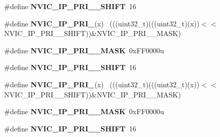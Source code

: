 \begin{DoxyCompactItemize}
\item 
\hypertarget{group___n_v_i_c___register___masks_ga18e47397c19f9f734a16ab82ab12a5a1}{}\#define {\bfseries N\+V\+I\+C\+\_\+\+I\+P\+\_\+\+P\+R\+I\+\_\+\_\+\+S\+H\+I\+F\+T}~16\label{group___n_v_i_c___register___masks_ga18e47397c19f9f734a16ab82ab12a5a1}

\item 
\hypertarget{group___n_v_i_c___register___masks_gaeccf3d1caf74b8e53c44c111b530082f}{}\#define {\bfseries N\+V\+I\+C\+\_\+\+I\+P\+\_\+\+P\+R\+I\+\_}(x)                                            ~(((uint32\+\_\+t)(((uint32\+\_\+t)(x))$<$$<$N\+V\+I\+C\+\_\+\+I\+P\+\_\+\+P\+R\+I\+\_\+\_\+\+S\+H\+I\+F\+T))\&N\+V\+I\+C\+\_\+\+I\+P\+\_\+\+P\+R\+I\+\_\+\_\+\+M\+A\+S\+K)\label{group___n_v_i_c___register___masks_gaeccf3d1caf74b8e53c44c111b530082f}

\item 
\hypertarget{group___n_v_i_c___register___masks_ga49a77ec05b40887c0ddc3ce4e47b72a8}{}\#define {\bfseries N\+V\+I\+C\+\_\+\+I\+P\+\_\+\+P\+R\+I\+\_\+\_\+\+M\+A\+S\+K}~0x\+F\+F0000u\label{group___n_v_i_c___register___masks_ga49a77ec05b40887c0ddc3ce4e47b72a8}

\item 
\hypertarget{group___n_v_i_c___register___masks_ga07ca207cbc1ff96a08afe00a45264736}{}\#define {\bfseries N\+V\+I\+C\+\_\+\+I\+P\+\_\+\+P\+R\+I\+\_\+\_\+\+S\+H\+I\+F\+T}~16\label{group___n_v_i_c___register___masks_ga07ca207cbc1ff96a08afe00a45264736}

\item 
\hypertarget{group___n_v_i_c___register___masks_ga006bdc94e3498aa49027847c18b26e91}{}\#define {\bfseries N\+V\+I\+C\+\_\+\+I\+P\+\_\+\+P\+R\+I\+\_}(x)                                            ~(((uint32\+\_\+t)(((uint32\+\_\+t)(x))$<$$<$N\+V\+I\+C\+\_\+\+I\+P\+\_\+\+P\+R\+I\+\_\+\_\+\+S\+H\+I\+F\+T))\&N\+V\+I\+C\+\_\+\+I\+P\+\_\+\+P\+R\+I\+\_\+\_\+\+M\+A\+S\+K)\label{group___n_v_i_c___register___masks_ga006bdc94e3498aa49027847c18b26e91}

\item 
\hypertarget{group___n_v_i_c___register___masks_ga9ad4afcd0277480b20a701370219cea6}{}\#define {\bfseries N\+V\+I\+C\+\_\+\+I\+P\+\_\+\+P\+R\+I\+\_\+\_\+\+M\+A\+S\+K}~0x\+F\+F0000u\label{group___n_v_i_c___register___masks_ga9ad4afcd0277480b20a701370219cea6}

\item 
\hypertarget{group___n_v_i_c___register___masks_ga48e92ec7aa1b11d5fd492338b748eaa4}{}\#define {\bfseries N\+V\+I\+C\+\_\+\+I\+P\+\_\+\+P\+R\+I\+\_\+\_\+\+S\+H\+I\+F\+T}~16\label{group___n_v_i_c___register___masks_ga48e92ec7aa1b11d5fd492338b748eaa4}


\end{DoxyCompactItemize}

